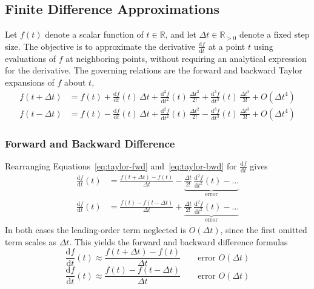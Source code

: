 \documentclass{article}
\begin{document}
\subsection{Finite Difference Approximations}
\label{sec:finite-difference}

Let $f(t)$ denote a scalar function of $t \in \mathbb{R}$, and let
$\Delta t \in \mathbb{R}_{>0}$ denote a fixed step size. The objective is
to approximate the derivative $\frac{\mathrm{d}f}{\mathrm{d}t}$ at a point $t$
using evaluations of $f$ at neighboring points, without requiring an
analytical expression for the derivative.
\newline The governing relations are the forward and backward Taylor expansions
of $f$ about $t$,
\begin{align}
f(t+\Delta t) &= f(t) + \frac{\mathrm{d}f}{\mathrm{d}t}(t)\,\Delta t
  + \frac{\mathrm{d}^2 f}{\mathrm{d}t^2}(t)\,\frac{\Delta t^2}{2!}
  + \frac{\mathrm{d}^3 f}{\mathrm{d}t^3}(t)\,\frac{\Delta t^3}{3!}
  + O(\Delta t^4) \label{eq:taylor-fwd} \\
f(t-\Delta t) &= f(t) - \frac{\mathrm{d}f}{\mathrm{d}t}(t)\,\Delta t
  + \frac{\mathrm{d}^2 f}{\mathrm{d}t^2}(t)\,\frac{\Delta t^2}{2!}
  - \frac{\mathrm{d}^3 f}{\mathrm{d}t^3}(t)\,\frac{\Delta t^3}{3!}
  + O(\Delta t^4) \label{eq:taylor-bwd}
\end{align}

\subsubsection{Forward and Backward Difference}
 
Rearranging Equations~\eqref{eq:taylor-fwd} and~\eqref{eq:taylor-bwd} for $\frac{\mathrm{d}f}{\mathrm{d}t}$ gives
\begin{align}
\frac{\mathrm{d}f}{\mathrm{d}t}(t) &= \frac{f(t+\Delta t) - f(t)}{\Delta t}
  - 
  \underbrace{\frac{\Delta t}{2!}\,\frac{\mathrm{d}^2 f}{\mathrm{d}t^2}(t) - \dots}_{\text{error}} \\[1ex]
\frac{\mathrm{d}f}{\mathrm{d}t}(t) &= \frac{f(t) - f(t-\Delta t)}{\Delta t}
  + \underbrace{\frac{\Delta t}{2!}\,\frac{\mathrm{d}^2 f}{\mathrm{d}t^2}(t) - \dots}_{\text{error}}
\end{align}
In both cases the leading-order term neglected is $O(\Delta t)$, since the first omitted term scales as $\Delta t$. This yields the forward and backward difference formulas
\begin{equation}
\frac{\mathrm{d}f}{\mathrm{d}t}(t) \approx \frac{f(t+\Delta t) - f(t)}{\Delta t}
  \qquad \text{error } O(\Delta t) \label{eq:forward-diff}
\end{equation}
\begin{equation}
\frac{\mathrm{d}f}{\mathrm{d}t}(t) \approx \frac{f(t) - f(t-\Delta t)}{\Delta t}
  \qquad \text{error } O(\Delta t) \label{eq:backward-diff}
\end{equation}
\end{document}
